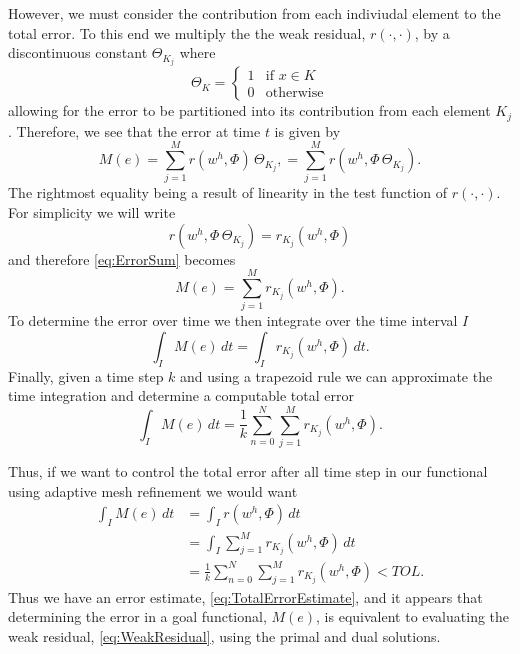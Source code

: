 However, we must consider the contribution from each indiviudal element to
the total error. To this end we multiply the the weak residual, $r(\cdot,
\cdot)$, by a discontinuous constant $\Theta_{K_j}$ where
\begin{equation}
    \Theta_K = \begin{cases}
        1 & \text{if } x \in K \\
        0 & \text{otherwise}
    \end{cases}
    \label{eq:DGTest}
\end{equation}
allowing for the error to be partitioned into its contribution from each element
$K_j$.
Therefore, we see that the error at time $t$ is given by
\begin{equation}
    M(e) = \sum_{j=1}^M r(w^h, \Phi) \, \Theta_{K_j},
         = \sum_{j=1}^M r(w^h, \Phi\, \Theta_{K_j}).
    \label{eq:ErrorSum}
\end{equation}
The rightmost equality being a result of linearity in the test function of
$r(\cdot, \cdot)$.  For simplicity we will write
\begin{equation*}
    r(w^h, \Phi\, \Theta_{K_j}) = r_{K_j}(w^h, \Phi)
\end{equation*}
and therefore \eqref{eq:ErrorSum} becomes
\begin{equation}
    M(e) = \sum_{j=1}^M r_{K_j}(w^h, \Phi).
    \label{eq:TotalError}
\end{equation}
To determine the error over time we then integrate over the time interval $I$
\begin{equation*}
    \int_I\! M(e)\, dt = \int_I\! r_{K_j}(w^h, \Phi)\, dt.
\end{equation*}
Finally, given a time step $k$ and using a trapezoid rule we can approximate the
time integration and determine a computable total error
\begin{equation}
    \int_I\! M(e)\, dt = \frac{1}{k} \sum_{n=0}^N \sum_{j=1}^M r_{K_j}(w^h, \Phi).
    \label{eq:TotalErrorEstimate}
\end{equation}

Thus, if we want to control the total error after all time step in our
functional using adaptive mesh refinement we would want
\begin{equation}
    \begin{split}
        \int_I\! M(e)\, dt &= \int_I\! r(w^h, \Phi)\, dt \\
            &= \int_I\! \sum_{j=1}^M r_{K_j}(w^h, \Phi)\, dt \\
            &= \frac{1}{k} \sum_{n=0}^N \sum_{j=1}^M r_{K_j}(w^h, \Phi) < TOL.
    \end{split}
    \label{eq:Tol}
\end{equation}
Thus we have an error estimate, \eqref{eq:TotalErrorEstimate}, and it appears
that determining the error in a goal functional, $M(e)$, is equivalent to
evaluating the weak residual, \eqref{eq:WeakResidual}, using the primal and dual
solutions.

